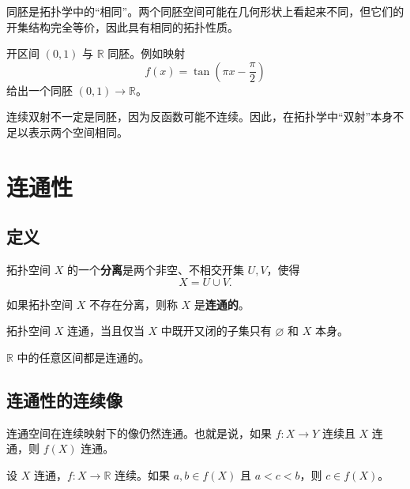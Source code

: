 同胚是拓扑学中的“相同”。两个同胚空间可能在几何形状上看起来不同，但它们的开集结构完全等价，因此具有相同的拓扑性质。

\begin{example}
开区间 $(0,1)$ 与 $\mathbb{R}$ 同胚。例如映射
\[
    f(x)=\tan\left(\pi x-\frac{\pi}{2}\right)
\]
给出一个同胚 $(0,1)\to\mathbb{R}$。
\end{example}

\begin{remark}
连续双射不一定是同胚，因为反函数可能不连续。因此，在拓扑学中“双射”本身不足以表示两个空间相同。
\end{remark}

\section{连通性}

\subsection{定义}

\begin{definition}[分离]
拓扑空间 $X$ 的一个\textbf{分离}是两个非空、不相交开集 $U,V$，使得
\[
    X=U\cup V.
\]
\end{definition}

\begin{definition}[连通空间]
如果拓扑空间 $X$ 不存在分离，则称 $X$ 是\textbf{连通的}。
\end{definition}

\begin{proposition}[等价刻画]
拓扑空间 $X$ 连通，当且仅当 $X$ 中既开又闭的子集只有 $\varnothing$ 和 $X$ 本身。
\end{proposition}

\begin{theorem}[区间的连通性]
$\mathbb{R}$ 中的任意区间都是连通的。
\end{theorem}

\subsection{连通性的连续像}

\begin{theorem}
连通空间在连续映射下的像仍然连通。也就是说，如果 $f:X\to Y$ 连续且 $X$ 连通，则 $f(X)$ 连通。
\end{theorem}

\begin{theorem}[介值定理]
设 $X$ 连通，$f:X\to\mathbb{R}$ 连续。如果 $a,b\in f(X)$ 且 $a<c<b$，则 $c\in f(X)$。
\end{theorem}

